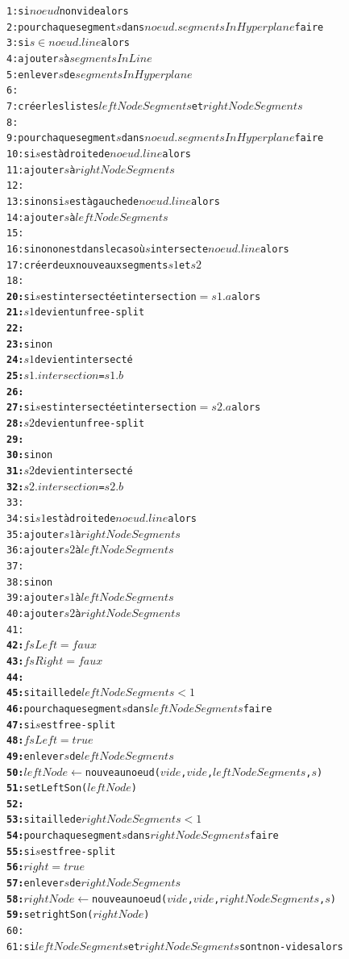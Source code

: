 \documentclass[11pt,a4paper]{article}
\begin{document}
\begin{alltt}
 1: si \(noeud\) non vide alors
 2:   pour chaque segment \(s\) dans \(noeud.segmentsInHyperplane\) faire
 3:     si \(s \in noeud.line\) alors
 4:       ajouter \(s\) à \(segmentsInLine\)
 5:       enlever \(s\) de \(segmentsInHyperplane\)
 6:       
 7:   créer les listes \(leftNodeSegments\) et \(rightNodeSegments\)
 8:   
 9:   pour chaque segment \(s\) dans \(noeud.segmentsInHyperplane\) faire
10:     si \(s\) est à droite de \(noeud.line\) alors
11:       ajouter \(s\) à \(rightNodeSegments\)
12:
13:     sinon si \(s\) est à gauche de \(noeud.line\) alors
14:       ajouter \(s\) à \(leftNodeSegments\)
15:
16:     sinon on est dans le cas où \(s\) intersecte \(noeud.line\) alors
17:       créer deux nouveaux segments \(s1\) et \(s2\)
18:
\textbf{20:}		      si \(s\) est intersecté et intersection \(=s1.a\) alors
\textbf{21:}		        \(s1\) devient un free-split
\textbf{22:}		    
\textbf{23:}		      sinon
\textbf{24:}		        \(s1\) devient intersecté
\textbf{25:}		        \(s1.intersection\) = \(s1.b\)
\textbf{26:}		    
\textbf{27:}		      si \(s\) est intersecté et intersection \(=s2.a\) alors
\textbf{28:}		        \(s2\) devient un free-split
\textbf{29:}		    
\textbf{30:}		      sinon
\textbf{31:}		        \(s2\) devient intersecté
\textbf{32:}		        \(s2.intersection\) = \(s2.b\)
33:		
34:       si \(s1\) est à droite de \(noeud.line\) alors
35:         ajouter \(s1\) à \(rightNodeSegments\)
36:         ajouter \(s2\) à \(leftNodeSegments\)
37:
38:       sinon
39:         ajouter \(s1\) à \(leftNodeSegments\)
40:         ajouter \(s2\) à \(rightNodeSegments\)
41:   
\textbf{42:}	  \(fsLeft = faux\)
\textbf{43:}	  \(fsRight = faux\)
\textbf{44:}      
\textbf{45:}   si taille de \(leftNodeSegments < 1\)
\textbf{46:}     pour chaque segment \(s\) dans \(leftNodeSegments\) faire
\textbf{47:}       si \(s\) est free-split
\textbf{48:}         \(fsLeft = true\)
\textbf{49:}         enlever \(s\) de \(leftNodeSegments\)
\textbf{50:}         \(leftNode \leftarrow \) nouveau noeud (\(vide\), \(vide\), \(leftNodeSegments\), \(s\))
\textbf{51:}         setLeftSon(\(leftNode\))
\textbf{52:}            
\textbf{53:}    si taille de \(rightNodeSegments < 1\)
\textbf{54:}      pour chaque segment \(s\) dans \(rightNodeSegments\) faire
\textbf{55:}        si \(s\) est free-split
\textbf{56:}          \(right = true\)
\textbf{57:}          enlever \(s\) de \(rightNodeSegments\)
\textbf{58:}          \(rightNode \leftarrow \) nouveau noeud (\(vide\), \(vide\), \(rightNodeSegments\), \(s\))
\textbf{59:}          setrightSon(\(rightNode\))
60:
61:   si \(leftNodeSegments\) et \(rightNodeSegments\) sont non-vides alors

\end{alltt}
\end{document}
